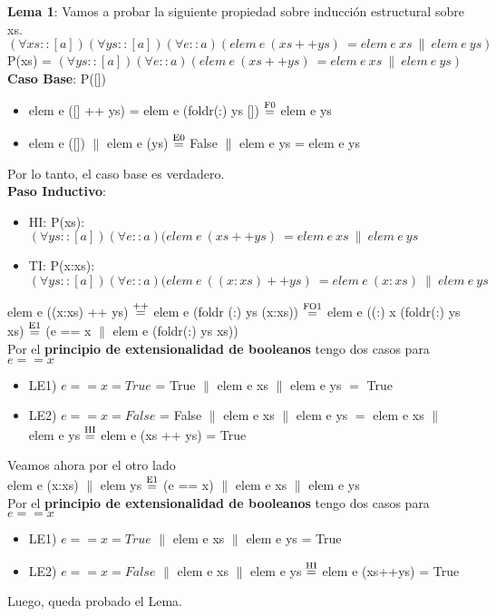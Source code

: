 \documentclass{article}
\begin{document}
\textbf{Lema 1}: Vamos a probar la siguiente propiedad sobre inducción estructural sobre xs. \\
$(\forall xs :: [a])(\forall ys :: [a])(\forall e::a)(elem \ e \ (xs++ys) \ = elem \ e \ xs \ \| \ elem \ e \ ys)$ \\
P(xs) = $(\forall ys :: [a])(\forall e::a)(elem \ e \ (xs++ys) \ = elem \ e \ xs \ \| \ elem \ e \ ys)$ \\
\textbf{Caso Base}: P([])
\begin{itemize}
    \item elem e ([] ++ ys) = elem e (foldr(:) ys []) $\stackrel{\text{F0}}{=}$ elem e ys
    \item elem e ([]) $\|$ elem e (ys) $\stackrel{\text{E0}}{=}$ False $\|$ elem e ys = elem e ys
\end{itemize}
Por lo tanto, el caso base es verdadero. \\
\textbf{Paso Inductivo}: 
\begin{itemize}
    \item HI: P(xs): $(\forall ys :: [a])(\forall e::a)(elem \ e \ (xs++ys) \ = elem \ e \ xs \ \| \ elem \ e \ ys$
    \item TI: P(x:xs): $(\forall ys :: [a])(\forall e::a)(elem \ e \ ((x:xs)++ys) \ = elem \ e \ (x:xs) \ \| \ elem \ e \ ys$
\end{itemize}
elem e ((x:xs) ++ ys) $\stackrel{\text{++}}{=}$ elem e (foldr (:) ys (x:xs)) $\stackrel{\text{FO1}}{=}$ elem e ((:) x (foldr(:) ys xs) $\stackrel{\text{E1}}{=}$ (e == x $\|$ elem e (foldr(:) ys xs)) \\
Por el \textbf{principio de extensionalidad de booleanos} tengo dos casos para $e==x$
\begin{itemize}
    \item LE1) $e==x = True$ = True $\|$ elem e xs $\|$ elem e ys $=$ True
    \item LE2) $e==x = False$ = False $\|$ elem e xs $\|$ elem e ys $=$ elem e xs $\|$ elem e ys $\stackrel{\text{HI}}{=}$ elem e (xs ++ ys) = True 
\end{itemize}
Veamos ahora por el otro lado \\
elem e (x:xs) $\|$ elem ys $\stackrel{\text{E1}}{=}$ (e == x) $\|$ elem e xs $\|$ elem e ys \\
Por el \textbf{principio de extensionalidad de booleanos} tengo dos casos para $e==x$
\begin{itemize}
    \item LE1) $e==x = True$ $\|$ elem e xs $\|$ elem e ys = True 
    \item LE2) $e==x = False$ $\|$ elem e xs $\|$ elem e ys $\stackrel{\text{HI}}{=}$ elem e (xs++ys) = True 
\end{itemize}
Luego, queda probado el Lema. 
\end{document}
